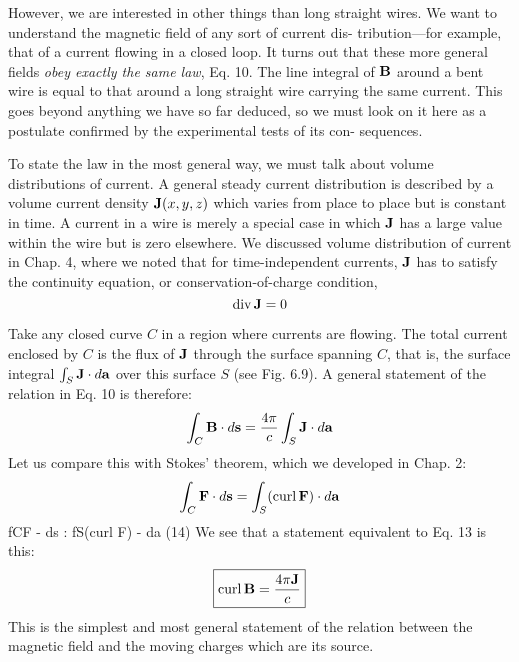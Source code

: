 However, we are interested in other things than long straight wires.
We want to understand the magnetic field of any sort of current dis-
tribution---for example, that of a current flowing in a closed loop. It
turns out that these more general fields \emph{obey exactly the same law},
Eq. 10. The line integral of $\mathbf{B}$ around a bent wire is equal to that
around a long straight wire carrying the same current. This goes
beyond anything we have so far deduced, so we must look on it here
as a postulate confirmed by the experimental tests of its con-
sequences.

To state the law in the most general way, we must talk about volume
distributions of current. A general steady current distribution
is described by a volume current density $\mathbf{J}(x,y,z)$ which varies from
place to place but is constant in time. A current in a wire is merely
a special case in which $\mathbf{J}$ has a large value within the wire but is zero
elsewhere. We discussed volume distribution of current in Chap. 4,
where we noted that for time-independent currents, $\mathbf{J}$ has to satisfy
the continuity equation, or conservation-of-charge condition,
\begin{equation}
  \operatorname{div}\mathbf{J} = 0
\end{equation}


Take any closed curve $C$ in a region where currents are flowing.
The total current enclosed by $C$ is the flux of $\mathbf{J}$ through the surface
spanning $C$, that is, the surface integral $\int_S\mathbf{J}\cdot d\mathbf{a}$ over this surface $S$
(see Fig. 6.9). A general statement of the relation in Eq. 10 is
therefore:
\begin{equation}
  \int_C \mathbf{B}\cdot d\mathbf{s} = \frac{4\pi}{c} \int_S \mathbf{J}\cdot d\mathbf{a}
\end{equation}
Let us compare this with Stokes' theorem, which we developed in
Chap. 2:
\begin{equation}
  \int_C \mathbf{F}\cdot d\mathbf{s} = \int_S(\operatorname{curl} \mathbf{F})\cdot d\mathbf{a}
\end{equation}
fCF - ds : fS(curl F) - da (14)
We see that a statement equivalent to Eq. 13 is this:
\begin{equation}
\boxed{
  \operatorname{curl}\mathbf{B} = \frac{4\pi\mathbf{J}}{c}
}
\end{equation}
This is the simplest and most general statement of the relation between
the magnetic field and the moving charges which are its source.

